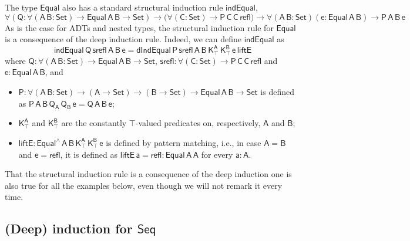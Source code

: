 \documentclass[9pt]{entcs} \usepackage{entcsmacro}
\begin{document}
The type $\mathsf{Equal}$ also has a standard structural induction rule $\mathsf{indEqual}$,
\[
\mathsf{\forall (Q : \forall (A\,B : Set) \to Equal\,A\,B \to Set)
  \to \big( \forall (C : Set) \to P\,C\,C\,refl \big)
  \to \forall (A\,B : Set) (e: Equal\,A\,B) \to P\,A\,B\,e}
\]
As is the case for ADTs and nested types,
the structural induction rule for $\mathsf{Equal}$ is a consequence of the deep induction rule.
Indeed, we can define $\mathsf{indEqual}$ as
\[
\mathsf{indEqual\,Q\,srefl\,A\,B\,e = dIndEqual\,P\,srefl\,A\,B\,K^A_\top\,K^B_\top\,e\,liftE}
\]
where
$\mathsf{Q : \forall (A\,B : Set) \to Equal\,A\,B \to Set}$,
$\mathsf{srefl: \forall (C : Set) \to P\,C\,C\,refl}$
and $\mathsf{e : Equal\,A\,B}$, and
\begin{itemize}
\item $\mathsf{P : \forall (A\,B : Set) \to (A \to Set) \to (B \to Set) \to Equal\,A\,B \to Set}$ is defined as
$\mathsf{P\,A\,B\,Q_A\,Q_B\,e = Q\,A\,B\,e}$;
\item $\mathsf{K^A_\top}$ and $\mathsf{K^B_\top}$ are the constantly $\mathsf{\top}$-valued predicates on, respectively, $\mathsf{A}$ and $\mathsf{B}$;
\item $\mathsf{liftE : Equal^{\wedge}\,A\,B\,K^A_\top\,K^B_\top\,e}$ is defined by pattern matching,
i.e., in case $\mathsf{A = B}$ and $\mathsf{e = refl}$,
it is defined as $\mathsf{liftE\,a = refl : Equal\,A\,A}$ for every $\mathsf{a : A}$.
\end{itemize}
That the structural induction rule is a consequence of the deep induction one is also true for all the examples below,
even though we will not remark it every time.



\subsection{(Deep) induction for $\mathsf{Seq}$}
\end{document}
